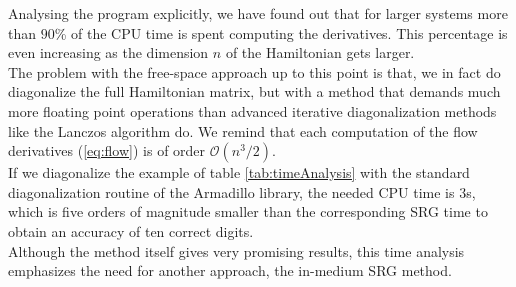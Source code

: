 Analysing the program explicitly, we have found out that for larger systems more than $90$\% of the CPU time is spent computing the derivatives. This percentage is even increasing as the dimension $n$ of the Hamiltonian gets larger.\\
The problem with the free-space approach up to this point is that, we in fact do diagonalize the full Hamiltonian matrix, but with a method that demands much more floating point operations than advanced iterative diagonalization methods like the Lanczos algorithm do. We remind that each computation of the flow derivatives (\ref{eq:flow}) is of order $\mathcal{O}(n^3/2)$.\\
If we diagonalize the example of table \ref{tab:timeAnalysis} with the standard diagonalization routine of the Armadillo library, the needed CPU time is $3$s, which is five orders of magnitude smaller than the corresponding SRG time to obtain an accuracy of ten correct digits.\\
Although the method itself gives very promising results, this time analysis emphasizes the need for another approach, the in-medium SRG method.
